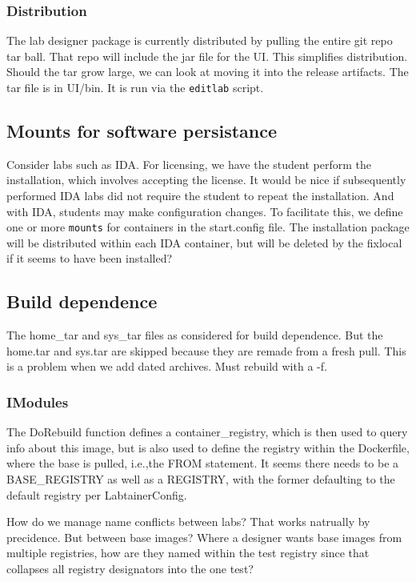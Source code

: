 \documentclass[12pt]{article}
\begin{document}
\subsubsection{Distribution}
The lab designer package is currently distributed by pulling the entire git repo tar ball.
That repo will include the jar file for the UI.  This simplifies distribution.  Should the tar grow large, we
can look at moving it into the release artifacts.  The tar file is in UI/bin.  It is run via the {\tt editlab}
script.

\subsection {Mounts for software persistance}
Consider labs such as IDA.  For licensing, we have the student perform the installation, which involves accepting
the license.  It would be nice if subsequently performed IDA labs did not require the student to repeat
the installation.  And with IDA, students may make configuration changes.  To facilitate this, we define
one or more {\tt mounts} for containers in the start.config file.  The installation package will be distributed
within each IDA container, but will be deleted by the fixlocal if it seems to have been installed?


\subsection {Build dependence}
The home\_tar and sys\_tar files as considered for build dependence.  But the home.tar and sys.tar are skipped because they are remade
from a fresh pull.  This is a problem when we add dated archives.  Must rebuild with a -f.
\subsubsection {IModules}
The DoRebuild function defines a container\_registry, which is then used to query info about this image, but is also used to define the
registry within the Dockerfile, where the base is pulled, i.e.,the FROM statement.  It seems there needs to be a BASE\_REGISTRY as well as
a REGISTRY, with the former defaulting to the default registry per LabtainerConfig.

How do we manage name conflicts between labs?  That works natrually by precidence.  But between base images?  Where a designer wants base
images from multiple registries, how are they named within the test registry since that collapses all registry designators into the one test?
\end{document}
